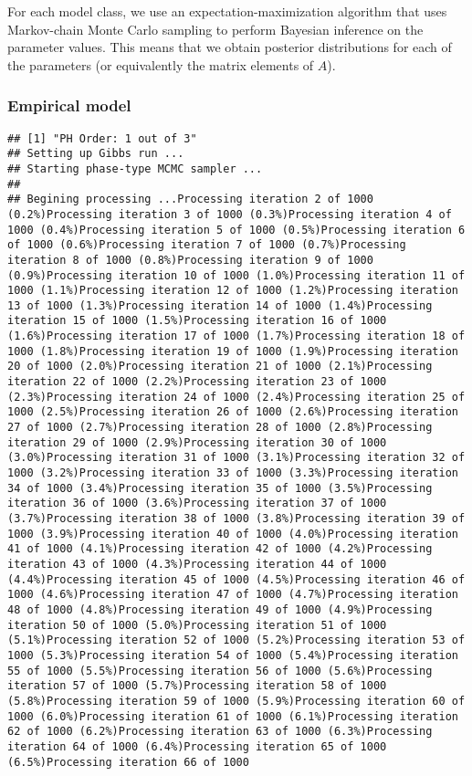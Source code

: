 \documentclass[
]{article}
\begin{document}
For each model class, we use an expectation-maximization algorithm that
uses Markov-chain Monte Carlo sampling to perform Bayesian inference on
the parameter values. This means that we obtain posterior distributions
for each of the parameters (or equivalently the matrix elements of
\(A\)).

\hypertarget{empirical-model}{%
\subsubsection{Empirical model}\label{empirical-model}}

\begin{verbatim}
## [1] "PH Order: 1 out of 3"
## Setting up Gibbs run ...
## Starting phase-type MCMC sampler ...
## 
## Begining processing ...Processing iteration 2 of 1000 (0.2%)Processing iteration 3 of 1000 (0.3%)Processing iteration 4 of 1000 (0.4%)Processing iteration 5 of 1000 (0.5%)Processing iteration 6 of 1000 (0.6%)Processing iteration 7 of 1000 (0.7%)Processing iteration 8 of 1000 (0.8%)Processing iteration 9 of 1000 (0.9%)Processing iteration 10 of 1000 (1.0%)Processing iteration 11 of 1000 (1.1%)Processing iteration 12 of 1000 (1.2%)Processing iteration 13 of 1000 (1.3%)Processing iteration 14 of 1000 (1.4%)Processing iteration 15 of 1000 (1.5%)Processing iteration 16 of 1000 (1.6%)Processing iteration 17 of 1000 (1.7%)Processing iteration 18 of 1000 (1.8%)Processing iteration 19 of 1000 (1.9%)Processing iteration 20 of 1000 (2.0%)Processing iteration 21 of 1000 (2.1%)Processing iteration 22 of 1000 (2.2%)Processing iteration 23 of 1000 (2.3%)Processing iteration 24 of 1000 (2.4%)Processing iteration 25 of 1000 (2.5%)Processing iteration 26 of 1000 (2.6%)Processing iteration 27 of 1000 (2.7%)Processing iteration 28 of 1000 (2.8%)Processing iteration 29 of 1000 (2.9%)Processing iteration 30 of 1000 (3.0%)Processing iteration 31 of 1000 (3.1%)Processing iteration 32 of 1000 (3.2%)Processing iteration 33 of 1000 (3.3%)Processing iteration 34 of 1000 (3.4%)Processing iteration 35 of 1000 (3.5%)Processing iteration 36 of 1000 (3.6%)Processing iteration 37 of 1000 (3.7%)Processing iteration 38 of 1000 (3.8%)Processing iteration 39 of 1000 (3.9%)Processing iteration 40 of 1000 (4.0%)Processing iteration 41 of 1000 (4.1%)Processing iteration 42 of 1000 (4.2%)Processing iteration 43 of 1000 (4.3%)Processing iteration 44 of 1000 (4.4%)Processing iteration 45 of 1000 (4.5%)Processing iteration 46 of 1000 (4.6%)Processing iteration 47 of 1000 (4.7%)Processing iteration 48 of 1000 (4.8%)Processing iteration 49 of 1000 (4.9%)Processing iteration 50 of 1000 (5.0%)Processing iteration 51 of 1000 (5.1%)Processing iteration 52 of 1000 (5.2%)Processing iteration 53 of 1000 (5.3%)Processing iteration 54 of 1000 (5.4%)Processing iteration 55 of 1000 (5.5%)Processing iteration 56 of 1000 (5.6%)Processing iteration 57 of 1000 (5.7%)Processing iteration 58 of 1000 (5.8%)Processing iteration 59 of 1000 (5.9%)Processing iteration 60 of 1000 (6.0%)Processing iteration 61 of 1000 (6.1%)Processing iteration 62 of 1000 (6.2%)Processing iteration 63 of 1000 (6.3%)Processing iteration 64 of 1000 (6.4%)Processing iteration 65 of 1000 (6.5%)Processing iteration 66 of 1000 
\end{verbatim}
\end{document}
